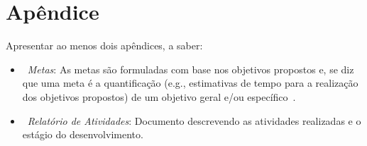 \chapter*{Apêndice}

Apresentar ao menos dois apêndices, a saber:

\begin{itemize}
 \item~\textit{Metas}: As metas são formuladas com base nos objetivos propostos e, se diz que uma meta é a quantificação (e.g., estimativas de tempo para a realização dos objetivos propostos) de um objetivo geral e/ou específico~\cite{Denscombe2012}.

\item~\textit{Relatório de Atividades}: Documento descrevendo as atividades realizadas e o estágio do desenvolvimento.
\end{itemize}

